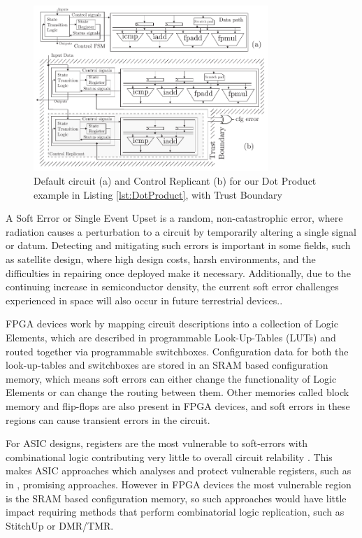 \begin{figure}[t]
\centering
\includegraphics[width=3.5in]{./imgs/StitchUpReplication.pdf}
\caption{Default circuit (a) and Control Replicant (b) for our Dot Product example in Listing \ref{lst:DotProduct}, with Trust Boundary \vspace{-5mm}}
\label{fig:HLSArch}
\end{figure}

A Soft Error or Single Event Upset is a random, non-catastrophic error, where radiation causes
a perturbation to a circuit by temporarily altering a single signal or datum.
Detecting and mitigating such errors is important in some fields, such as satellite design,
where high design costs, harsh environments, and the difficulties in repairing once deployed make it necessary.
Additionally, due to the continuing increase in semiconductor density, the current soft error challenges 
experienced in space will also occur in future terrestrial devices.\cite{normand1996single}\cite{henkel2013reliable}.

FPGA devices work by mapping circuit descriptions into a collection of Logic Elements,
which are described in programmable Look-Up-Tables (LUTs) and routed together via
programmable switchboxes.
Configuration data for both the look-up-tables and switchboxes are stored in an SRAM based
configuration memory, which means soft errors can either change the functionality
of Logic Elements or can change the routing between them.
Other memories called block memory and flip-flops are also present in FPGA devices,
and soft errors in these regions can cause transient errors in the circuit.

For ASIC designs, registers are the most vulnerable to soft-errors with
combinational logic contributing very little to overall circuit relability \cite{baumann2005soft}.
This makes ASIC approaches which analyses and protect vulnerable registers, such as in \cite{chen2014reliability},
promising approaches.
However in FPGA devices the most vulnerable region is the SRAM based configuration memory,
so such approaches would have little impact requiring methods that perform combinatorial logic
replication, such as StitchUp or DMR/TMR.

